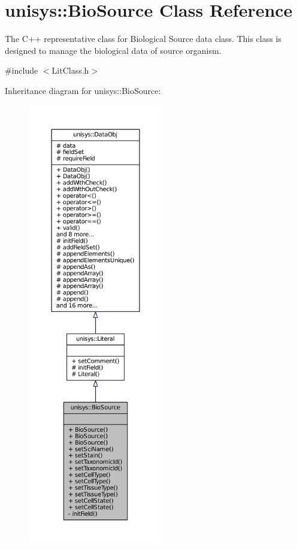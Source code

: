 \hypertarget{classunisys_1_1BioSource}{\section{unisys\-:\-:Bio\-Source Class Reference}
\label{classunisys_1_1BioSource}
}


The C++ representative class for Biological Source data class. This class is designed to manage the biological data of source organism.  




{\ttfamily \#include $<$Lit\-Class.\-h$>$}



Inheritance diagram for unisys\-:\-:Bio\-Source\-:
\nopagebreak
\begin{figure}[H]
\begin{center}
\leavevmode
\includegraphics[height=550pt]{classunisys_1_1BioSource__inherit__graph}
\end{center}
\end{figure}


